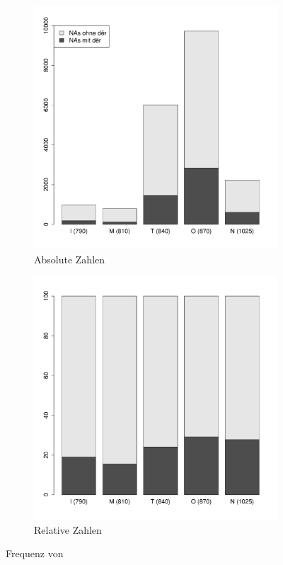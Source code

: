 \vfill
\begin{figure}
\begin{subfigure}[b]{.5\linewidth}
  \includegraphics[width=\linewidth]{generated/images/artikel-anzahl-abs}
\caption {Absolute Zahlen}
\label{fig:art-abs}
\end{subfigure}%
\begin{subfigure}[b]{.5\linewidth}
  \includegraphics[width=\linewidth]{generated/images/artikel-anzahl-rel}
\caption {Relative Zahlen}
\label{fig:art-rel}
\end{subfigure}
\caption{Frequenz von }
\label{abb:art-freq}
\end{figure}
\vfill\pagebreak


